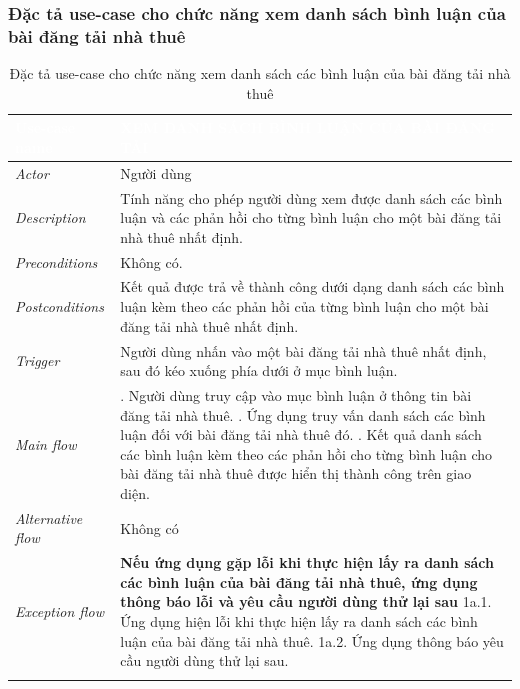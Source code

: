 \subsubsection{Đặc tả use-case cho chức năng xem danh sách bình luận của bài đăng tải nhà thuê}
\begin{center}
    \arrayrulewidth=2pt
    \begin{longtable}{
        |>{\raggedright\arraybackslash}p{3cm}
        |>{\raggedright\arraybackslash}p{13cm}
        |}
        \hline
        \rowcolor{cyan!75!black} \textcolor{white}{\textbf{Use-case name}} & \textcolor{white}{\textbf{XEM DANH SÁCH BÌNH LUẬN CỦA BÀI ĐĂNG TẢI}}
        \\\hline
        \rowcolor{cyan!10!white} \textit{Actor} & Người dùng
        \\\hdashline
        \rowcolor{cyan!10!white} \textit{Description} & Tính năng cho phép người dùng xem được danh sách các bình luận và các phản hồi cho từng bình luận cho một bài đăng tải nhà thuê nhất định.
        \\\hdashline
        \rowcolor{cyan!10!white} \textit{Preconditions} & Không có.
        \\\hdashline
        \rowcolor{cyan!10!white} \textit{Postconditions} & Kết quả được trả về thành công dưới dạng danh sách các bình luận kèm theo các phản hồi của từng bình luận cho một bài đăng tải nhà thuê nhất định.
        \\\hdashline
        \rowcolor{cyan!10!white} \textit{Trigger} & Người dùng nhấn vào một bài đăng tải nhà thuê nhất định, sau đó kéo xuống phía dưới ở mục bình luận.
        \\\hdashline
        \rowcolor{cyan!10!white} \textit{Main flow} &
        1. Người dùng truy cập vào mục bình luận ở thông tin bài đăng tải nhà thuê. \newline
        2. Ứng dụng truy vấn danh sách các bình luận đối với bài đăng tải nhà thuê đó. \newline
        3. Kết quả danh sách các bình luận kèm theo các phản hồi cho từng bình luận cho bài đăng tải nhà thuê được hiển thị thành công trên giao diện.
        \\\hdashline
        \rowcolor{cyan!10!white} \textit{Alternative flow} & Không có
        \\\hdashline
        \rowcolor{cyan!10!white} \textit{Exception flow} &
        \textbf{Nếu ứng dụng gặp lỗi khi thực hiện lấy ra danh sách các bình luận của bài đăng tải nhà thuê, ứng dụng thông báo lỗi và yêu cầu người dùng thử lại sau} \newline
        1a.1. Ứng dụng hiện lỗi khi thực hiện lấy ra danh sách các bình luận của bài đăng tải nhà thuê. \newline
        1a.2. Ứng dụng thông báo yêu cầu người dùng thử lại sau.
        \\\hline
        \caption{Đặc tả use-case cho chức năng xem danh sách các bình luận của bài đăng tải nhà thuê}
    \end{longtable}
\end{center}
